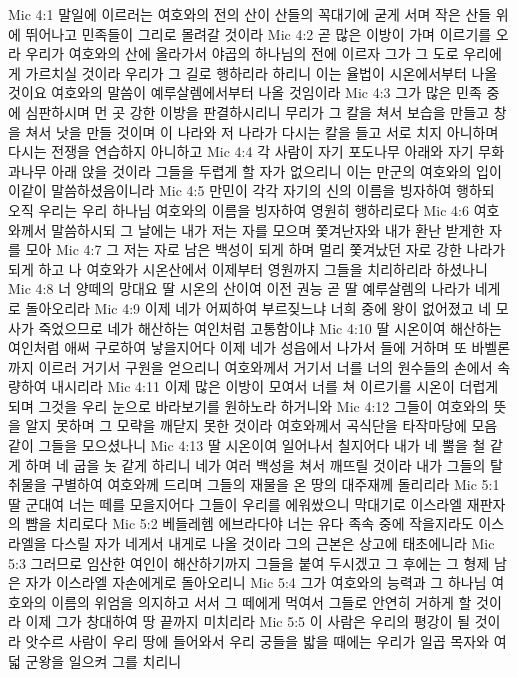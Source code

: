 Mic 4:1  말일에 이르러는 여호와의 전의 산이 산들의 꼭대기에 굳게 서며 작은 산들 위에 뛰어나고 민족들이 그리로 몰려갈 것이라
Mic 4:2  곧 많은 이방이 가며 이르기를 오라 우리가 여호와의 산에 올라가서 야곱의 하나님의 전에 이르자 그가 그 도로 우리에게 가르치실 것이라 우리가 그 길로 행하리라 하리니 이는 율법이 시온에서부터 나올 것이요 여호와의 말씀이 예루살렘에서부터 나올 것임이라
Mic 4:3  그가 많은 민족 중에 심판하시며 먼 곳 강한 이방을 판결하시리니 무리가 그 칼을 쳐서 보습을 만들고 창을 쳐서 낫을 만들 것이며 이 나라와 저 나라가 다시는 칼을 들고 서로 치지 아니하며 다시는 전쟁을 연습하지 아니하고
Mic 4:4  각 사람이 자기 포도나무 아래와 자기 무화과나무 아래 앉을 것이라 그들을 두렵게 할 자가 없으리니 이는 만군의 여호와의 입이 이같이 말씀하셨음이니라
Mic 4:5  만민이 각각 자기의 신의 이름을 빙자하여 행하되 오직 우리는 우리 하나님 여호와의 이름을 빙자하여 영원히 행하리로다
Mic 4:6  여호와께서 말씀하시되 그 날에는 내가 저는 자를 모으며 쫓겨난자와 내가 환난 받게한 자를 모아
Mic 4:7  그 저는 자로 남은 백성이 되게 하며 멀리 쫓겨났던 자로 강한 나라가 되게 하고 나 여호와가 시온산에서 이제부터 영원까지 그들을 치리하리라 하셨나니
Mic 4:8  너 양떼의 망대요 딸 시온의 산이여 이전 권능 곧 딸 예루살렘의 나라가 네게로 돌아오리라
Mic 4:9  이제 네가 어찌하여 부르짖느냐 너희 중에 왕이 없어졌고 네 모사가 죽었으므로 네가 해산하는 여인처럼 고통함이냐
Mic 4:10  딸 시온이여 해산하는 여인처럼 애써 구로하여 낳을지어다 이제 네가 성읍에서 나가서 들에 거하며 또 바벨론까지 이르러 거기서 구원을 얻으리니 여호와께서 거기서 너를 너의 원수들의 손에서 속량하여 내시리라
Mic 4:11  이제 많은 이방이 모여서 너를 쳐 이르기를 시온이 더럽게 되며 그것을 우리 눈으로 바라보기를 원하노라 하거니와
Mic 4:12  그들이 여호와의 뜻을 알지 못하며 그 모략을 깨닫지 못한 것이라 여호와께서 곡식단을 타작마당에 모음 같이 그들을 모으셨나니
Mic 4:13  딸 시온이여 일어나서 칠지어다 내가 네 뿔을 철 같게 하며 네 굽을 놋 같게 하리니 네가 여러 백성을 쳐서 깨뜨릴 것이라 내가 그들의 탈취물을 구별하여 여호와께 드리며 그들의 재물을 온 땅의 대주재께 돌리리라
Mic 5:1  딸 군대여 너는 떼를 모을지어다 그들이 우리를 에워쌌으니 막대기로 이스라엘 재판자의 뺨을 치리로다
Mic 5:2  베들레헴 에브라다야 너는 유다 족속 중에 작을지라도 이스라엘을 다스릴 자가 네게서 내게로 나올 것이라 그의 근본은 상고에 태초에니라
Mic 5:3  그러므로 임산한 여인이 해산하기까지 그들을 붙여 두시겠고 그 후에는 그 형제 남은 자가 이스라엘 자손에게로 돌아오리니
Mic 5:4  그가 여호와의 능력과 그 하나님 여호와의 이름의 위엄을 의지하고 서서 그 떼에게 먹여서 그들로 안연히 거하게 할 것이라 이제 그가 창대하여 땅 끝까지 미치리라
Mic 5:5  이 사람은 우리의 평강이 될 것이라 앗수르 사람이 우리 땅에 들어와서 우리 궁들을 밟을 때에는 우리가 일곱 목자와 여덟 군왕을 일으켜 그를 치리니
